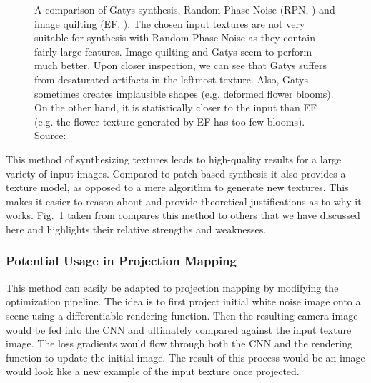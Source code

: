 \begin{figure}[h]
    \begin{subfigure}[b]{\textwidth}
        \centering
    \end{subfigure}
    \caption{A comparison of Gatys synthesis, Random Phase Noise (RPN, \citet{Galerne2011}) and image quilting (EF, \citet{Efros2001}). The chosen input textures are not very suitable for synthesis with Random Phase Noise as they contain fairly large features. Image quilting and Gatys seem to perform much better. Upon closer inspection, we can see that Gatys suffers from desaturated artifacts in the leftmost texture. Also, Gatys sometimes creates implausible shapes (e.g. deformed flower blooms). On the other hand, it is statistically closer to the input than EF (e.g. the flower texture generated by EF has too few blooms). Source: \citet{Raad2018}}
    \label{fig:background_synthesis_comparison}
\end{figure}

This method of synthesizing textures leads to high-quality results for a large variety of input images. Compared to patch-based synthesis it also provides a texture model, as opposed to a mere algorithm to generate new textures. This makes it easier to reason about and provide theoretical justifications as to why it works. Fig.~\ref{fig:background_synthesis_comparison} taken from \citet{Raad2018} compares this method to others that we have discussed here and highlights their relative strengths and weaknesses.

\subsubsection{Potential Usage in Projection Mapping}
\label{section:background-texture_synthesis-statistics_based-projection_mapping}

This method can easily be adapted to projection mapping by modifying the optimization pipeline. The idea is to first project initial white noise image onto a scene using a differentiable rendering function. Then the resulting camera image would be fed into the CNN and ultimately compared against the input texture image. The loss gradients would flow through both the CNN and the rendering function to update the initial image. The result of this process would be an image would look like a new example of the input texture once projected.